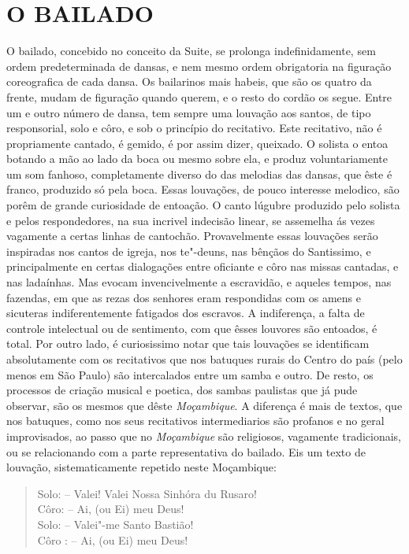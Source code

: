 \section{O BAILADO}

O bailado, concebido no conceito da Suite, se prolonga indefinidamente,
sem ordem predeterminada de dansas, e nem mesmo ordem obrigatoria na
figuração coreografica de cada dansa. Os bailarinos mais habeis, que são
os quatro da frente, mudam de figuração quando querem, e o resto do
cordão os segue. Entre um e outro número de dansa, tem sempre uma
louvação aos santos, de tipo responsorial, solo e côro, e sob o
princípio do recitativo. Este recitativo, não é propriamente cantado, é
gemido, é por assim dizer, queixado. O solista o entoa botando a mão ao
lado da boca ou mesmo sobre ela, e produz voluntariamente um som
fanhoso, completamente diverso do das melodias das dansas, que êste é
franco, produzido só pela boca. Essas louvações, de pouco interesse
melodico, são porêm de grande curiosidade de entoação. O canto lúgubre
produzido pelo solista e pelos respondedores, na sua incrivel indecisão
linear, se assemelha ás vezes vagamente a certas linhas de cantochão.
Provavelmente essas louvações serão inspiradas nos cantos de igreja, nos
te"-deuns, nas bênçãos do Santissimo, e principalmente en certas
dialogações entre oficiante e côro nas missas cantadas, e nas ladaínhas.
Mas evocam invencivelmente a escravidão, e aqueles tempos, nas fazendas,
em que as rezas dos senhores eram respondidas com os amens e sicuteras
indiferentemente fatigados dos escravos. A indiferença, a falta de
controle intelectual ou de sentimento, com que êsses louvores são
entoados, é total. Por outro lado, é curiosissimo notar que tais
louvações se identificam absolutamente com os recitativos que nos
batuques rurais do Centro do país (pelo menos em São Paulo) são
intercalados entre um samba e outro. De resto, os processos de criação
musical e poetica, dos sambas paulistas que já pude observar, são os
mesmos que dêste \emph{Moçambique}. A diferença é mais de textos, que
nos batuques, como nos seus recitativos intermediarios são profanos e no
geral improvisados, ao passo que no \emph{Moçambique} são religiosos,
vagamente tradicionais, ou se relacionando com a parte representativa do
bailado. Eis um texto de louvação, sistematicamente repetido neste
Moçambique:

\begin{verse}
Solo: -- Valei! Valei Nossa Sinhóra du Rusaro!\\
Côro: -- Ai, (ou Ei) meu Deus!\\
Solo: -- Valei"-me Santo Bastião!\\
Côro : -- Ai, (ou Ei) meu Deus!
\end{verse}

